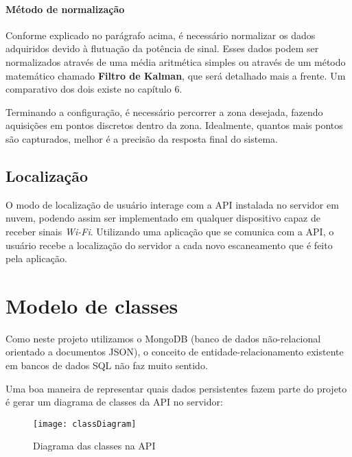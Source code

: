 \paragraph{Método de normalização\\}
Conforme explicado no parágrafo acima, é necessário normalizar os dados adquiridos devido à flutuação da potência de sinal. Esses dados podem ser normalizados através de uma média aritmética simples ou através de um método matemático chamado \textbf{Filtro de Kalman}, que será detalhado mais a frente. Um comparativo dos dois existe no capítulo 6.
\par

Terminando a configuração, é necessário percorrer a zona desejada, fazendo aquisições em pontos discretos dentro da zona. Idealmente, quantos mais pontos são capturados, melhor é a precisão da resposta final do sistema.

\subsection{Localização}
O modo de localização de usuário interage com a API instalada no servidor em nuvem, podendo assim ser implementado em qualquer dispositivo capaz de receber sinais \textit{Wi-Fi}. Utilizando uma aplicação que se comunica com a API, o usuário recebe a localização do servidor a cada novo escaneamento que é feito pela aplicação.

\section{Modelo de classes}
Como neste projeto utilizamos o MongoDB (banco de dados não-relacional orientado a documentos JSON), o conceito de entidade-relacionamento existente em bancos de dados SQL não faz muito sentido.
\par
Uma boa maneira de representar quais dados persistentes fazem parte do projeto é gerar um diagrama de classes da API no servidor:
\begin{figure}[H]
	\centering
	\caption{Diagrama das classes na API}
  \texttt{[image: classDiagram]}
\label{fig:diagramaClasse}
\end{figure}


